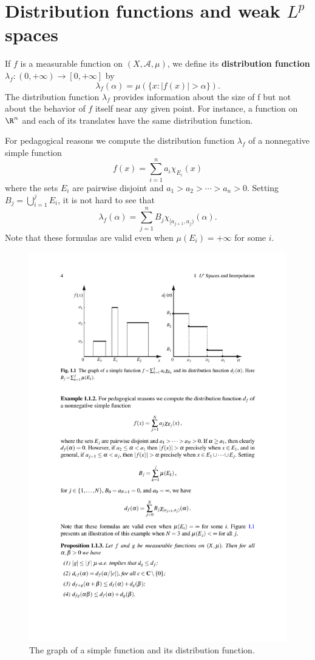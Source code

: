 \section{Distribution functions and weak \boldmath$L^p$ spaces}
If $f$ is a measurable function on $(X,\mathcal{A},\mu)$, we define its \textbf{distribution function} $\lambda_f:(0,+\infty)\to[0,+\infty]$ by
\[\lambda_f(\alpha)=\mu(\{x:|f(x)|>\alpha\}).\]
The distribution function $\lambda_f$ provides information about the size of f but not about the behavior of $f$ itself near any given point. For instance, a function on $\R^n$ and each of its translates have the same distribution function.
\begin{example}\label{distribution of simple function}
For pedagogical reasons we compute the distribution function $\lambda_f$ of
a nonnegative simple function
\[f(x)=\sum_{i=1}^{n}a_i\chi_{E_i}(x)\]
where the sets $E_i$ are pairwise disjoint and $a_1>a_2>\cdots>a_n>0$. Setting $B_j=\bigcup_{i=1}^{j}E_i$, it is not hard to see that
\[\lambda_f(\alpha)=\sum_{j=1}^{n}B_j\chi_{[a_{j+1},a_j)}(\alpha).\]
Note that these formulas are valid even when $\mu(E_i)=+\infty$ for some $i$.
\end{example}
\begin{figure}[htbp]
\centering
\includegraphics{pictures/distribution-of-simple}
\caption{The graph of a simple function and its distribution function.}
\end{figure}
